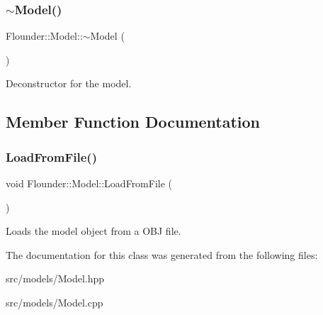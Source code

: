 \subsubsection{\texorpdfstring{$\sim$\+Model()}{~Model()}}
{\footnotesize\ttfamily Flounder\+::\+Model\+::$\sim$\+Model (\begin{DoxyParamCaption}{ }\end{DoxyParamCaption})}



Deconstructor for the model. 



\subsection{Member Function Documentation}
\mbox{\label{class_flounder_1_1_model_a4662f9d99d9058e7e1e890c35b9694dd}} 
\subsubsection{\texorpdfstring{Load\+From\+File()}{LoadFromFile()}}
{\footnotesize\ttfamily void Flounder\+::\+Model\+::\+Load\+From\+File (\begin{DoxyParamCaption}{ }\end{DoxyParamCaption})\hspace{0.3cm}{\ttfamily [private]}}



Loads the model object from a O\+BJ file. 



The documentation for this class was generated from the following files\+:\begin{DoxyCompactItemize}
\item 
src/models/Model.\+hpp\item 
src/models/Model.\+cpp\end{DoxyCompactItemize}
